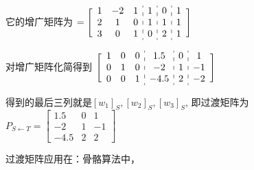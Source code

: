 它的增广矩阵为
\begin{math}
    [ { \begin{array}{c:c:c:c} 
        \begin{matrix} v_1&v_2&v_3 \end{matrix} &
        \begin{matrix} w_1 \end{matrix} &
        \begin{matrix} w_2 \end{matrix} &
        \begin{matrix} w_3 \end{matrix} 
    \end{array}} ] = \Bigg [ {\begin{array}{c:c:c:c} 
        \begin{matrix} 1&-2&1\\2&1&0\\3&0&1 \end{matrix} &
        \begin{matrix} 1\\1\\0 \end{matrix} &
        \begin{matrix} 0\\1\\2 \end{matrix} &
        \begin{matrix} 1\\1\\1 \end{matrix} 
    \end{array}}
    \Bigg ]
\end{math}

对增广矩阵化简得到
\begin{math}
    \Bigg [ {\begin{array}{c:c:c:c} 
    \begin{matrix} 1&0&0\\0&1&0\\0&0&1 \end{matrix} &
    \begin{matrix} 1.5\\-2\\-4.5 \end{matrix} &
    \begin{matrix} 0\\1\\2 \end{matrix} &
    \begin{matrix} 1\\-1\\-2 \end{matrix} 
\end{array}}
\Bigg ]
\end{math}

得到的最后三列就是$[w_1]_S, [w_2]_S,[w_3]_S$, 即过渡矩阵为
\begin{math}
    P_{S \leftarrow T} = \begin{bmatrix}
        1.5 & 0 & 1 \\
        -2 & 1 & -1 \\
        -4.5 & 2 & 2
    \end{bmatrix}
\end{math}

过渡矩阵应用在：骨骼算法中，
